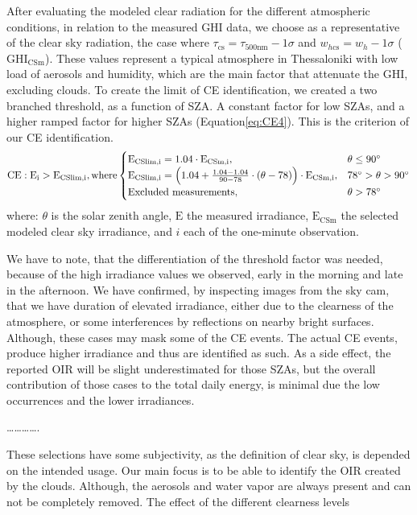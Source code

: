 \documentclass[preprint, 3p,
authoryear]{elsarticle} %
\begin{document}
After evaluating the modeled clear radiation for the different
atmospheric conditions, in relation to the measured GHI data, we choose
as a representative of the clear sky radiation, the case where
\(\tau_{\text{cs}} = \tau_{500\text{nm}} - 1\sigma\) and
\(w_{h\text{cs}} = w_h - 1\sigma\) (\(\text{GHI}_\text{CSm}\)). These
values represent a typical atmosphere in Thessaloniki with low load of
aerosols and humidity, which are the main factor that attenuate the GHI,
excluding clouds. To create the limit of CE identification, we created a
two branched threshold, as a function of SZA. A constant factor for low
SZAs, and a higher ramped factor for higher SZAs
(Equation\nobreakspace\ref{eq:CE4}). This is the criterion of our CE
identification. \begin{equation}
\text{CE} : \text{E}_\text{i} > \text{E}_\text{CSlim,i}, \text{where} \begin{cases}
 \text{E}_\text{CSlim,i} = 1.04 \cdot \text{E}_\text{CSm,i}, & \text{$\theta \leq 90^\circ$}\\
\text{E}_\text{CSlim,i} = \left ({ 1.04 + \frac{1.04 - 1.04}{90 - 78} \cdot (\theta- 78) } \right ) \cdot \text{E}_\text{CSm,i}, & \text{$ 78^\circ > \theta > 90^\circ$}\\
\text{Excluded measurements}, & \theta > 78^\circ
\end{cases}\label{eq:CE4}
\end{equation} where: \(\theta\) is the solar zenith angle, \(\text{E}\)
the measured irradiance, \(\text{E}_\text{CSm}\) the selected modeled
clear sky irradiance, and \(i\) each of the one-minute observation.

We have to note, that the differentiation of the threshold factor was
needed, because of the high irradiance values we observed, early in the
morning and late in the afternoon. We have confirmed, by inspecting
images from the sky cam, that we have duration of elevated irradiance,
either due to the clearness of the atmosphere, or some interferences by
reflections on nearby bright surfaces. Although, these cases may mask
some of the CE events. The actual CE events, produce higher irradiance
and thus are identified as such. As a side effect, the reported OIR will
be slight underestimated for those SZAs, but the overall contribution of
those cases to the total daily energy, is minimal due the low
occurrences and the lower irradiances.

\ldots\ldots\ldots\ldots.

These selections have some subjectivity, as the definition of clear sky,
is depended on the intended usage. Our main focus is to be able to
identify the OIR created by the clouds. Although, the aerosols and water
vapor are always present and can not be completely removed. The effect
of the different clearness levels
\end{document}
